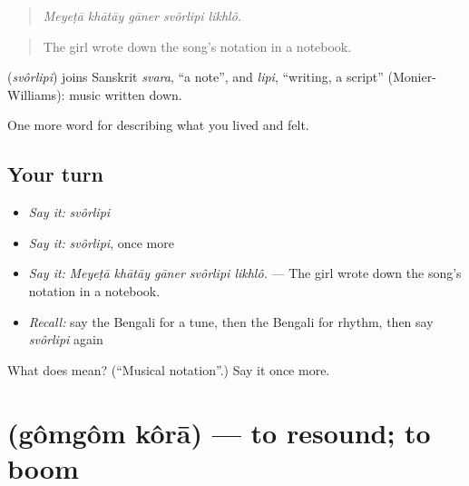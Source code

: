 \begin{quote}
    
\end{quote}

\begin{quote}
\emph{Meyeṭā khātāy gāner svôrlipi likhlô.}
\end{quote}

\begin{quote}
The girl wrote down the song's notation in a notebook.
\end{quote}

\begin{cousinweb}
\textbf{} (\emph{svôrlipi}) joins Sanskrit \emph{svara}, \textquotedblleft{}a note\textquotedblright{}, and \emph{lipi}, \textquotedblleft{}writing, a script\textquotedblright{} (Monier-Williams): music written down.
\end{cousinweb}

\begin{grammarlens}[title={What you've built}]
One more word for describing what you lived and felt.
\end{grammarlens}

\subsection*{Your turn}
\begin{itemize}
\raggedright
  \item \emph{Say it:} \emph{svôrlipi}
  \item \emph{Say it:} \emph{svôrlipi}, once more
  \item \emph{Say it:} \emph{Meyeṭā khātāy gāner svôrlipi likhlô.} — The girl wrote down the song's notation in a notebook.
  \item \emph{Recall:} say the Bengali for a tune, then the Bengali for rhythm, then say \emph{svôrlipi} again
\end{itemize}

\begin{tcolorbox}[breakable,colback=teal!4,colframe=teal!35!black,title={Before you move on}]
What does  mean? (\textquotedblleft{}Musical notation\textquotedblright{}.) Say it once more.
\end{tcolorbox}
\section[\texorpdfstring{\bn{গমগম} \bn{করা} (gômgôm kôrā)}{গমগম করা (gômgôm kôrā)}]{  (gômgôm kôrā) — to resound; to boom}

